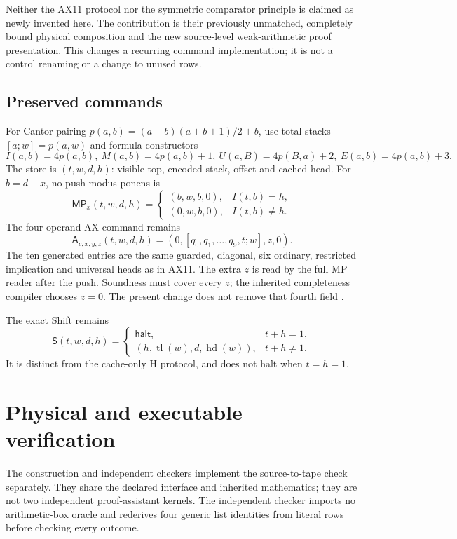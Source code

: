 \documentclass[11pt,letterpaper]{article}
\begin{document}
Neither the AX11 protocol nor the symmetric comparator principle is
claimed as newly invented here. The contribution is their previously
unmatched, completely bound physical composition and the new source-level
weak-arithmetic proof presentation. This changes a recurring command
implementation; it is not a control renaming or a change to unused rows.

\subsection{Preserved commands}
For Cantor pairing $p(a,b)=(a+b)(a+b+1)/2+b$, use total stacks
$[a;w]=p(a,w)$ and formula constructors
\[
I(a,b)=4p(a,b),\ M(a,b)=4p(a,b)+1,\
U(a,B)=4p(B,a)+2,\ E(a,b)=4p(a,b)+3.
\]
The store is $(t,w,d,h)$: visible top, encoded stack, offset and cached
head. For $b=d+x$, no-push modus ponens is
\[
\mathsf{MP}_x(t,w,d,h)=
\begin{cases}(b,w,b,0),&I(t,b)=h,\\(0,w,b,0),&I(t,b)\ne h.\end{cases}
\]
The four-operand AX command remains
\[
\mathsf A_{c,x,y,z}(t,w,d,h)
=(0,[q_0,q_1,\ldots,q_9,t;w],z,0).
\]
The ten generated entries are the same guarded, diagonal, six ordinary,
restricted implication and universal heads as in AX11. The extra $z$
is read by the full MP reader after the push. Soundness must cover every
$z$; the inherited completeness compiler chooses $z=0$. The present
change does not remove that fourth field \cite{ax11}.

The exact Shift remains
\[
\mathsf S(t,w,d,h)=
\begin{cases}\mathsf{halt},&t+h=1,\\
(h,\operatorname{tl}(w),d,\operatorname{hd}(w)),&t+h\ne1.
\end{cases}
\]
It is distinct from the cache-only H protocol, and does not halt when
$t=h=1$.



\section{Physical and executable verification}
The construction and independent checkers implement the source-to-tape
check separately. They share the declared interface and inherited
mathematics; they are not two independent proof-assistant kernels. The
independent checker imports no arithmetic-box oracle and rederives four
generic list identities from literal rows before checking every outcome.

\end{document}
